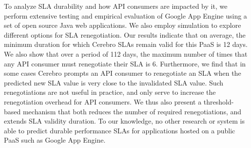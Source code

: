 To analyze SLA durability and how API consumers are 
impacted by it, we perform extensive testing and empirical evaluation
of Google App Engine using a set of open source Java web applications.  
We also employ simulation to explore different options for SLA renegotiation.
Our results indicate that on average, the minimum duration for which Cerebro SLAs 
remain valid for this PaaS is 12 days. We also show that
over a period of 112 days, the maximum number of times that any API consumer must renegotiate
their SLA is 6.  Furthermore, we find that in some cases Cerebro prompts an API consumer to
renegotiate an SLA when the predicted new SLA value is very close to the invalidated SLA value. 
Such renegotiations are not useful in practice, and only serve to increase the renegotiation overhead
for API consumers. We thus also present a threshold-based mechanism that both reduces 
the number of required renegotiations, and extends SLA validity duration.
To our knowledge, no other research or system is able to predict
durable performance SLAs for applications hosted on a public PaaS such as Google App Engine.